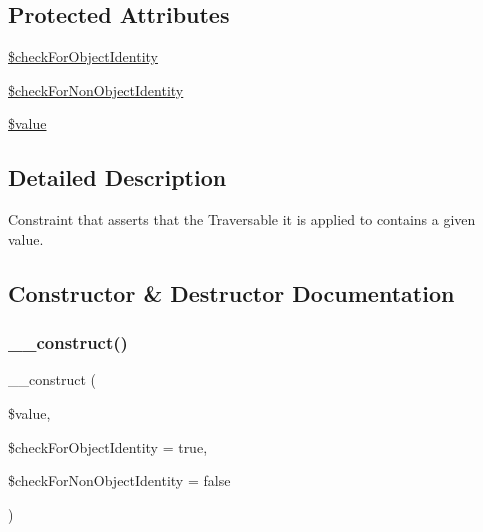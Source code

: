 \subsection*{Protected Attributes}
\begin{DoxyCompactItemize}
\item 
\mbox{\hyperlink{class_p_h_p_unit___framework___constraint___traversable_contains_a6c50cb214d3d926b13fdb137fe052f3d}{\$check\+For\+Object\+Identity}}
\item 
\mbox{\hyperlink{class_p_h_p_unit___framework___constraint___traversable_contains_a7b4a636cc761dbadd872ac853a89d033}{\$check\+For\+Non\+Object\+Identity}}
\item 
\mbox{\hyperlink{class_p_h_p_unit___framework___constraint___traversable_contains_a0f298096f322952a72a50f98a74c7b60}{\$value}}
\end{DoxyCompactItemize}


\subsection{Detailed Description}
Constraint that asserts that the Traversable it is applied to contains a given value. 

\subsection{Constructor \& Destructor Documentation}
\mbox{\label{class_p_h_p_unit___framework___constraint___traversable_contains_ac7be096c59869e7105d2e4a321c78924}} 
\subsubsection{\texorpdfstring{\+\_\+\+\_\+construct()}{\_\_construct()}}
{\footnotesize\ttfamily \+\_\+\+\_\+construct (\begin{DoxyParamCaption}\item[{}]{\$value,  }\item[{}]{\$check\+For\+Object\+Identity = {\ttfamily true},  }\item[{}]{\$check\+For\+Non\+Object\+Identity = {\ttfamily false} }\end{DoxyParamCaption})}


